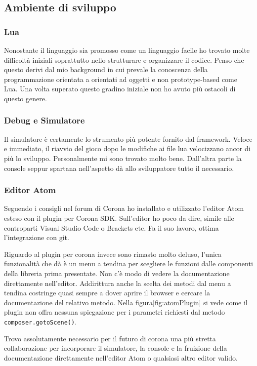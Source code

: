 	\subsection{Ambiente di sviluppo}
	
		\subsubsection{Lua}
			Nonostante il linguaggio sia promosso come un linguaggio facile ho trovato molte difficoltà iniziali soprattutto nello strutturare e organizzare il codice. Penso che questo derivi dal mio background in cui prevale la conoscenza della programmazione orientata a orientati ad oggetti e non prototype-based come Lua. Una volta superato questo gradino iniziale non ho avuto più ostacoli di questo genere.
		
		\subsubsection{Debug e Simulatore}
			Il simulatore è certamente lo strumento più potente fornito dal framework. Veloce e immediato, il riavvio del gioco dopo le modifiche ai file lua velocizzano ancor di più lo sviluppo. Personalmente mi sono trovato molto bene. Dall'altra parte la console seppur spartana nell'aspetto dà allo sviluppatore tutto il necessario. 
	
		\subsubsection{Editor Atom}
			Seguendo i consigli nel forum di Corona ho installato e utilizzato l'editor Atom esteso con il plugin per Corona SDK. Sull'editor ho poco da dire, simile alle controparti Visual Studio Code o Brackets etc. Fa il suo lavoro, ottima l'integrazione con git.
			
			Riguardo al plugin per corona invece sono rimasto molto deluso, l'unica funzionalità che dà è un menu a tendina per scegliere le funzioni dalle componenti della libreria prima presentate. Non c'è modo di vedere la documentazione direttamente nell'editor. Addirittura anche la scelta dei metodi dal menu a tendina costringe quasi sempre a dover aprire il browser e cercare la documentazione del relativo metodo. Nella figura\ref{fig:atomPlugin} si vede come il plugin non offra nessuna spiegazione per i parametri richiesti dal metodo \verb|composer.gotoScene()|.
			
			Trovo assolutamente necessario per il futuro di corona una più stretta collaborazione per incorporare il simulatore, la console e la fruizione della documentazione direttamente nell'editor Atom o qualsiasi altro editor valido.
			
